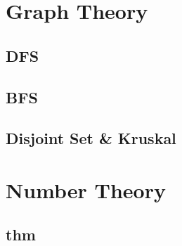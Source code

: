\section{Graph Theory}
    \subsection{DFS}
        
    \subsection{BFS}
        
    \subsection{Disjoint Set & Kruskal}
        

\section{Number Theory}
    \subsection{thm}
        